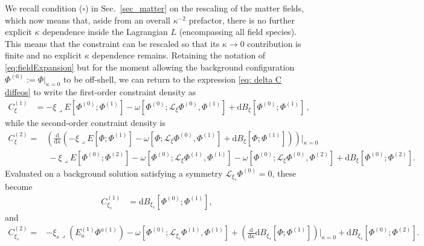 \documentclass[]{jkpaper}
\theoremstyle{plain}
\theoremstyle{definition}
\newcommand{\sins}{\mathop{\lrcorner}}
\newcommand{\sd}{\mathrm {d}}
\def\extd{\mathrm {d}}
\newcommand{\sL}{\mathcal{L}}
\begin{document}
We recall condition ({\color{red}$\square$}) in Sec.~\ref{sec_matter} on the rescaling of the matter fields, which now means that, aside from an overall $\kappa^{-2}$ prefactor, there is no further explicit $\kappa$ dependence inside the Lagrangian $L$ (encompassing all field species).
This means that the constraint can be rescaled so that its $\kappa\rightarrow 0$ contribution is finite and no explicit $\kappa$ dependence remains.  Retaining the notation of \eqref{eq:fieldExpansion} but for the moment allowing the background configuration $\Phi^{(0)}:=\Phi|_{\kappa=0}$ to be off-shell, we can return to the expression \eqref{eq: delta C diffeos} to write the first-order constraint density as
\begin{equation}\begin{split}\label{eq: first order constraint, diffeo}
     C_{\xi}^{(1)}
     &= -\xi\sins E\left[\Phi^{(0)};\Phi^{(1)}\right] -\omega\left[\Phi^{(0)};\sL_\xi\Phi^{(0)}, \Phi^{(1)}\right]+ \sd B_{\xi}\left[\Phi^{(0)}; \Phi^{(1)}\right]\,,
\end{split}\end{equation}
while the second-order constraint density is
\begin{equation}\begin{split}\label{eq: second order constraint, diffeo}
     C_\xi^{(2)}
      =&
      \left(\frac{\extd}{\extd\kappa}\left(-\xi\sins E\left[\Phi;\Phi^{(1)}\right]
      - \omega\left[\Phi;\sL_\xi\Phi^{(0)},\Phi^{(1)}\right]
      +\sd B_\xi\left[\Phi;\Phi^{(1)}\right]
      \right)\right)\bigg|_{\kappa=0}\\
      &~
      -\xi\sins E\left[\Phi^{(0)};\Phi^{(2)}\right]
      -\omega\left[\Phi^{(0)};\sL_\xi\Phi^{(1)},\Phi^{(1)}\right]
      -\omega\left[\Phi^{(0)};\sL_\xi\Phi^{(0)},\Phi^{(2)}\right]
      +\sd B_\xi\left[\Phi^{(0)};\Phi^{(2)}\right].
\end{split}\end{equation}
Evaluated on a background solution satisfying a symmetry $\sL_{\xi_s}\Phi^{(0)}=0$, these become
\begin{equation}\begin{split}\label{eq: first order constraint, diffeo with sym}
     C_{\xi_s}^{(1)}
     &= \sd B_{\xi_s}\left[\Phi^{(0)}; \Phi^{(1)}\right],
\end{split}\end{equation}
and
\begin{equation}\begin{split}\label{eq: second order constraint, diffeo with sym1}
     C_{\xi_s}^{(2)}
      =&
      -\xi_s\sins\left(E^{(1)}_a \Phi^{a(1)}\right)
      -\omega\left[\Phi^{(0)};\sL_{\xi_s}\Phi^{(1)},\Phi^{(1)}\right]
      +\left(\frac{\extd}{\extd\kappa}\sd B_{\xi_s}\left[\Phi;\Phi^{(1)}\right]
      \right)\bigg|_{\kappa=0}
      +\sd B_{\xi_s}\left[\Phi^{(0)};\Phi^{(2)}\right].
\end{split}\end{equation}
\end{document}
